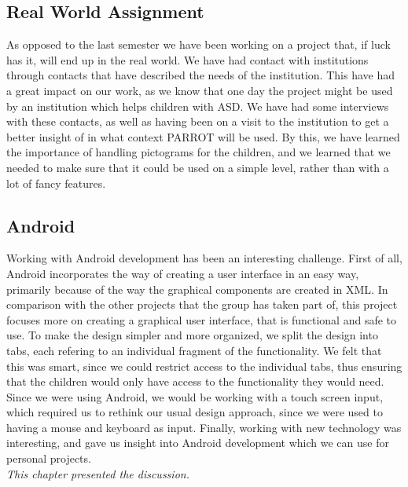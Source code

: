 \subsection*{Real World Assignment}
As opposed to the last semester we have been working on a project that, if luck has it, will end up in the real world.\newline
We have had contact with institutions through contacts that have described the needs of the institution.\newline
This have had a great impact on our work, as we know that one day the project might be used by an institution which helps children with ASD. 
We have had some interviews with these contacts, as well as having been on a visit to the institution to get a better insight of in what context PARROT will be used. 
By this, we have learned the importance of handling pictograms for the children, and we learned that we needed to make sure that it could be used on a simple level, rather than with a lot of fancy features. 



\subsection*{Android}
Working with Android development has been an interesting challenge. First of all, Android incorporates the way of creating a user interface in an easy way, primarily because of the way the graphical components are created in XML.\newline
In comparison with the other projects that the group has taken part of, this project focuses more on creating a graphical user interface, that is functional and safe to use.\newline
To make the design simpler and more organized, we split the design into tabs, each refering to an individual fragment of the functionality. We felt that this was smart, since we could restrict access to the individual tabs, thus ensuring that the children would only have access to the functionality they would need.\newline
Since we were using Android, we would be working with a touch screen input, which required us to rethink our usual design approach, since we were used to having a mouse and keyboard as input.\newline
Finally, working with new technology was interesting, and gave us insight into Android development which we can use for personal projects.\newline
\\
\textit{This chapter presented the discussion.}